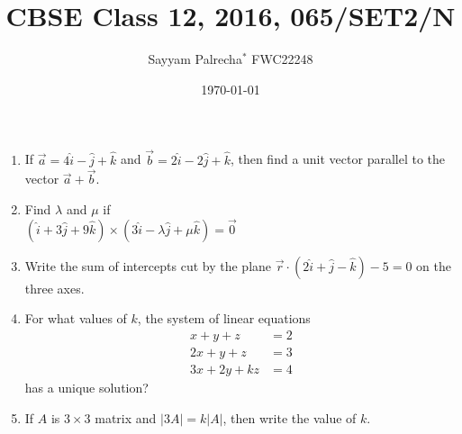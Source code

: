 \documentclass[12pt,-letter paper]{article}
\providecommand{\brak}[1]{\ensuremath{\left(#1\right)}}
\theoremstyle{remark}
\providecommand{\abs}[1]{\left\vert#1\right\vert}
\let\vec\mathbf
\begin{document}


\vspace{3cm}

\author{Sayyam Palrecha$^{*}$ FWC22248%
}
\title{CBSE Class 12, 2016, 065/SET2/N}
\date{\today}

\maketitle

\bigskip

\renewcommand{\thefigure}{\theenumi}
\renewcommand{\thetable}{\theenumi}

\begin{enumerate}

\begin{center} $\vec{SECTION-A}$ \\ \end{center}
\item If $\overrightarrow{a} = 4\hat{i} -\hat{j} + \hat{k}$ and $\overrightarrow{b} = 2\hat{i} -2\hat{j} + \hat{k} $, then find a unit vector parallel to the vector $\overrightarrow{a} + \overrightarrow{b} $.\\

\item Find $\lambda$ and $\mu$ if\\
$\brak{\hat{i} + 3\hat{j} + 9\hat{k}}\times\brak{3\hat{i} - \lambda\hat{j} + \mu\hat{k}} = \overrightarrow{0}$\\

\item Write the sum of intercepts cut by the plane $\overrightarrow{r}\cdot\brak{2\hat{i} + \hat{j} - \hat{k}} - 5 = 0$ on the three axes.\\

\item For what values of $k$, the system of linear equations
\begin{align*}
x+y+z &= 2\\
2x+y+z &= 3\\
3x+2y+kz &= 4
\end{align*}
has a unique solution?\\

\item If $A$ is $3\times 3$ matrix and $\abs{3A} = k\abs{A}$, then write the value of $k$.\\


\end{enumerate}
\end{document}
